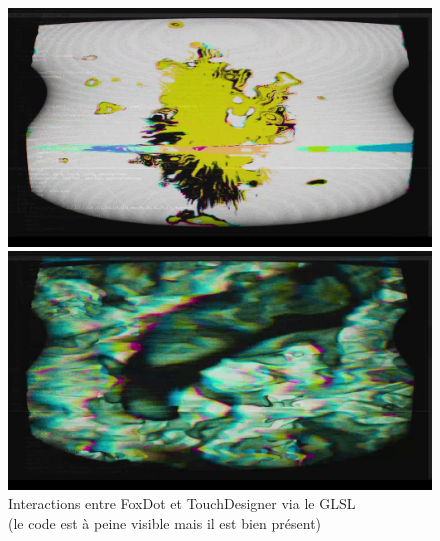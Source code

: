 \begin{figure}[h]
  \begin{minipage}[b]{0.45\linewidth}
    \centering
    \includegraphics[width=\linewidth]{images/experiments/intensifs/intensifs21.png}
  \end{minipage}
  \hspace{0.1\linewidth} %
  \begin{minipage}[b]{0.45\linewidth}
    \centering
    \includegraphics[width=\linewidth]{images/experiments/intensifs/intensifs22.png}
  \end{minipage}
  \label{intensifs21}
  \caption{
            Interactions entre FoxDot et TouchDesigner via le GLSL \\
            (le code est à peine visible mais il est bien présent)
        }
\end{figure}

